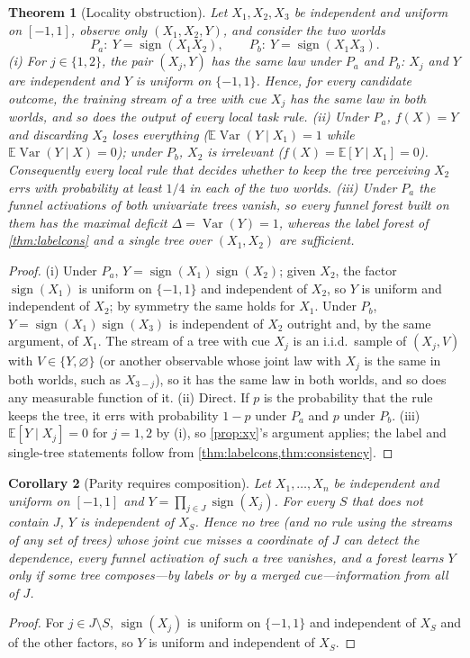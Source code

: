 \documentclass[11pt]{article}
\newtheorem{theorem}{Theorem}
\newtheorem{corollary}[theorem]{Corollary}
\theoremstyle{definition}
\theoremstyle{remark}
\newcommand{\E}{\mathbb{E}}
\newcommand{\Var}{\operatorname{Var}}
\begin{document}
\begin{theorem}[Locality obstruction]\label{thm:locality}
Let $X_1,X_2,X_3$ be independent and uniform on $[-1,1]$, observe only $(X_1,X_2,Y)$,
and consider the two worlds
\[
  P_a:\ Y=\operatorname{sign}(X_1X_2),\qquad P_b:\ Y=\operatorname{sign}(X_1X_3).
\]
(i) For $j\in\{1,2\}$, the pair $(X_j,Y)$ has the same law under $P_a$ and $P_b$: $X_j$
and $Y$ are independent and $Y$ is uniform on $\{-1,1\}$.  Hence, for every candidate
outcome, the training stream of a tree with cue $X_j$ has the same law in both worlds,
and so does the output of every local task rule.  (ii) Under $P_a$, $f(X)=Y$ and
discarding $X_2$ loses everything ($\E\Var(Y\mid X_1)=1$ while $\E\Var(Y\mid X)=0$);
under $P_b$, $X_2$ is irrelevant ($f(X)=\E[Y\mid X_1]=0$).  Consequently every local rule that decides whether to keep the tree perceiving $X_2$ errs with probability at
least $1/4$ in each of the two worlds.  (iii) Under $P_a$ the funnel activations of both
univariate trees vanish, so every funnel forest built on them has the maximal deficit
$\Delta=\Var(Y)=1$, whereas the label forest of \cref{thm:labelcons} and a single tree
over $(X_1,X_2)$ are sufficient.
\end{theorem}
\begin{proof}
(i) Under $P_a$, $Y=\operatorname{sign}(X_1)\operatorname{sign}(X_2)$; given $X_2$, the
factor $\operatorname{sign}(X_1)$ is uniform on $\{-1,1\}$ and independent of $X_2$, so
$Y$ is uniform and independent of $X_2$; by symmetry the same holds for $X_1$.  Under
$P_b$, $Y=\operatorname{sign}(X_1)\operatorname{sign}(X_3)$ is independent of $X_2$
outright and, by the same argument, of $X_1$.  The stream of a tree with cue $X_j$ is an
i.i.d.\ sample of $(X_j,V)$ with $V\in\{Y,\varnothing\}$ (or another observable whose
joint law with $X_j$ is the same in both worlds, such as $X_{3-j}$), so it has the same
law in both worlds, and so does any measurable function of it.  (ii) Direct.  If $p$ is
the probability that the rule keeps the tree, it errs with probability $1-p$ under
$P_a$ and $p$ under $P_b$.  (iii) $\E[Y\mid X_j]=0$ for $j=1,2$ by (i), so
\cref{prop:xy}'s argument applies; the label and single-tree statements follow from
\cref{thm:labelcons,thm:consistency}.
\end{proof}

\begin{corollary}[Parity requires composition]\label{cor:parity}
Let $X_1,\dots,X_n$ be independent and uniform on $[-1,1]$ and
$Y=\prod_{j\in J}\operatorname{sign}(X_j)$.  For every $S$ that does not contain $J$,
$Y$ is independent of $X_S$.  Hence no tree (and no rule using the streams of any set of
trees) whose joint cue misses a coordinate of $J$ can detect the dependence, every
funnel activation of such a tree vanishes, and a forest learns $Y$ only if some tree
composes---by labels or by a merged cue---information from all of $J$.
\end{corollary}
\begin{proof}
For $j\in J\setminus S$, $\operatorname{sign}(X_j)$ is uniform on $\{-1,1\}$ and
independent of $X_S$ and of the other factors, so $Y$ is uniform and independent of $X_S$.
\end{proof}
\end{document}
